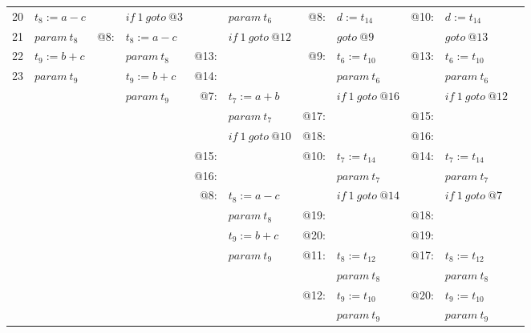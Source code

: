 \documentclass[landscape]{article}
\begin{document}
\begin{tabular}{rlrlrlrlrll}
20 & $t_{8}:=a-c$ &  & $if\:1\:goto\:@3$ &  & $param\:t_{6}$ & @8: & $d:=t_{14}$ & @10: & $d:=t_{14}$ & \\
21 & $param\:t_{8}$ & @8: & $t_{8}:=a-c$ &  & $if\:1\:goto\:@12$ &  & $goto\:@9$ &  & $goto\:@13$ & \\
22 & $t_{9}:=b+c$ &  & $param\:t_{8}$ & @13: & & @9: & $t_{6}:=t_{10}$ & @13: & $t_{6}:=t_{10}$ & \\
23 & $param\:t_{9}$ &  & $t_{9}:=b+c$ & @14: & &  & $param\:t_{6}$ &  & $param\:t_{6}$ & \\
 & &  & $param\:t_{9}$ & @7: & $t_{7}:=a+b$ &  & $if\:1\:goto\:@16$ &  & $if\:1\:goto\:@12$ & \\
 & &  & &  & $param\:t_{7}$ & @17: & & @15: & & \\
 & &  & &  & $if\:1\:goto\:@10$ & @18: & & @16: & & \\
 & &  & & @15: & & @10: & $t_{7}:=t_{14}$ & @14: & $t_{7}:=t_{14}$ & \\
 & &  & & @16: & &  & $param\:t_{7}$ &  & $param\:t_{7}$ & \\
 & &  & & @8: & $t_{8}:=a-c$ &  & $if\:1\:goto\:@14$ &  & $if\:1\:goto\:@7$ & \\
 & &  & &  & $param\:t_{8}$ & @19: & & @18: & & \\
 & &  & &  & $t_{9}:=b+c$ & @20: & & @19: & & \\
 & &  & &  & $param\:t_{9}$ & @11: & $t_{8}:=t_{12}$ & @17: & $t_{8}:=t_{12}$ & \\
 & &  & &  & &  & $param\:t_{8}$ &  & $param\:t_{8}$ & \\
 & &  & &  & & @12: & $t_{9}:=t_{10}$ & @20: & $t_{9}:=t_{10}$ & \\
 & &  & &  & &  & $param\:t_{9}$ &  & $param\:t_{9}$ & \\
\end{tabular}
\end{document}
